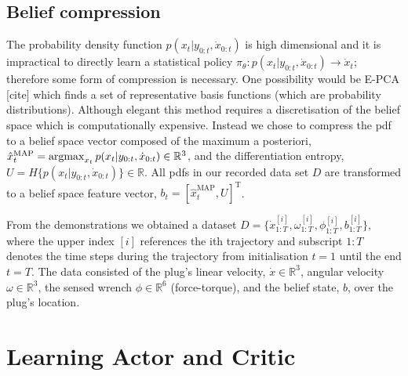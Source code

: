 \subsection{Belief compression}

The probability density function $p(x_t|y_{0:t},\dot{x}_{0:t})$ is high dimensional and it is 
impractical to directly learn a statistical policy $\pi_{\theta} : p(x_t|y_{0:t},\dot{x}_{0:t}) \rightarrow \dot{x}_t$; 
therefore some form of compression is necessary. One possibility would be E-PCA [cite] which finds a set of 
representative basis functions (which are probability distributions). Although elegant this method 
requires a discretisation of the belief space which is computationally expensive. Instead we chose to 
compress the pdf to a belief space vector composed of the maximum a posteriori, $\hat{x}^{\mathrm{MAP}}_t = \argmax_{x_t} p(x_t|y_{0:t},\dot{x}_{0:t}) \in \mathbb{R}^3$, and the differentiation entropy, 
$U = H\{p(x_t|y_{0:t},\dot{x}_{0:t})\} \in \mathbb{R}$. All pdfs in our recorded data set $D$ are transformed to 
a belief space feature vector, $b_t = [\hat{x}^{\mathrm{MAP}}_t,U]^{\mathrm{T}}$. 

From the demonstrations we obtained a dataset $D=\{\dot{x}^{[i]}_{1:T},\omega^{[i]}_{1:T},\phi^{[i]}_{1:T},b^{[i]}_{1:T}\}$, 
where the upper index $[i]$ references the ith trajectory and subscript $1:T$ denotes the time steps during the trajectory
from initialisation $t=1$ until the end $t=T$. The data consisted of the plug's linear velocity, $\dot{x} \in \mathbb{R}^3$, 
angular velocity $\omega \in \mathbb{R}^3$, the sensed wrench $\phi \in \mathbb{R}^6$ (force-torque),
and the belief state, $b$, over the plug's location.



\section{Learning Actor and Critic}\label{sec:learning-value-actor}


